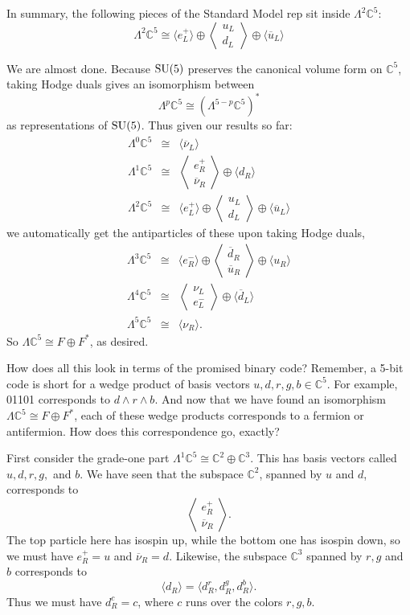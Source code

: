 \documentclass[12pt]{article}
\newcommand{\C}{{\mathbb C}}  %
\newcommand{\SU}{{\rm SU}}    %
\newcommand{\Ex}{\Lambda} %
\newcommand{\iso}{\cong} %
\newcommand{\ubar}{\overline{u}} %
\newcommand{\dbar}{\overline{d}} %
\newcommand{\nubar}{\overline{\nu}} %
\newcommand{\anglep}{\left\langle \! \begin{array}{c} \nu_L \\ e^-_L \end{array} \! \right\rangle} %
\newcommand{\angantilep}{\left\langle \! \begin{array}{c} e^+_R \\ \nubar_R \end{array} \! \right\rangle} %
\newcommand{\angquark}{\left\langle \! \begin{array}{c} u_L \\ d_L \end{array} \! \right\rangle} %
\newcommand{\angantiquark}{\left\langle \! \begin{array}{c} \dbar_R \\ \ubar_R \end{array} \! \right\rangle} %
\begin{document}
In summary, the following pieces of the Standard Model rep
sit inside $\Ex^2 \C^5$:
\[ \Ex^2 \C^5 \iso \langle e^+_L \rangle \oplus \angquark \oplus 
\langle \ubar_L \rangle \]

We are almost done. Because $\SU(5)$ preserves the canonical volume form on
$\C^5$, taking Hodge duals gives an isomorphism between
\[ \Ex^p \C^5 \iso (\Ex^{5 - p} \C^5)^* \]
as representations of $\SU(5)$.  Thus given our results so far:
\begin{eqnarray*}
\Ex^0 \C^5 & \iso & \langle \nubar_L \rangle \\
\Ex^1 \C^5 & \iso & \angantilep \oplus \langle d_R \rangle \\
\Ex^2 \C^5 & \iso & \langle e^+_L \rangle \oplus \angquark \oplus 
\langle \ubar_L \rangle
\end{eqnarray*}
we automatically get the antiparticles of these upon taking Hodge duals,
\begin{eqnarray*}
\Ex^3 \C^5 & \iso & \langle e^-_R \rangle \oplus \angantiquark \oplus 
\langle u_R \rangle \\
\Ex^4 \C^5 & \iso & \anglep \oplus \langle \dbar_L \rangle \\
\Ex^5 \C^5 & \iso & \langle \nu_R \rangle.
\end{eqnarray*}
So $\Ex \C^5 \iso F \oplus F^*$, as desired.

How does all this look in terms of the promised binary code? 
Remember, a 5-bit code is short for a wedge product of
basis vectors $u,d,r,g,b \in \C^5$.  For example, 01101 corresponds
to $d \wedge r \wedge b$.  And now that we have found an isomorphism 
$\Ex \C^5 \iso F \oplus F^*$, each of these wedge products corresponds
to a fermion or antifermion.  How does this correspondence go, exactly?
 
First consider the grade-one part $\Ex^1 \C^5 \iso \C^2 \oplus \C^3$.
This has basis vectors called $u,d,r,g,$ and $b$.  We have seen that
the subspace $\C^2$, spanned by $u$ and $d$, corresponds to 
\[   \angantilep.   \]
The top particle here has isospin up, while the bottom one has
isospin down, so we must have $e^+_R = u$ and $\nubar_R = d$.
Likewise, the subspace $\C^3$ spanned by $r,g$ and $b$ corresponds to
\[     \langle d_R \rangle = \langle d_R^r, d_R^g, d_R^b \rangle . \] 
Thus we must have $d^c_R = c$, where $c$ runs over the colors $r,g,b$.
\end{document}
